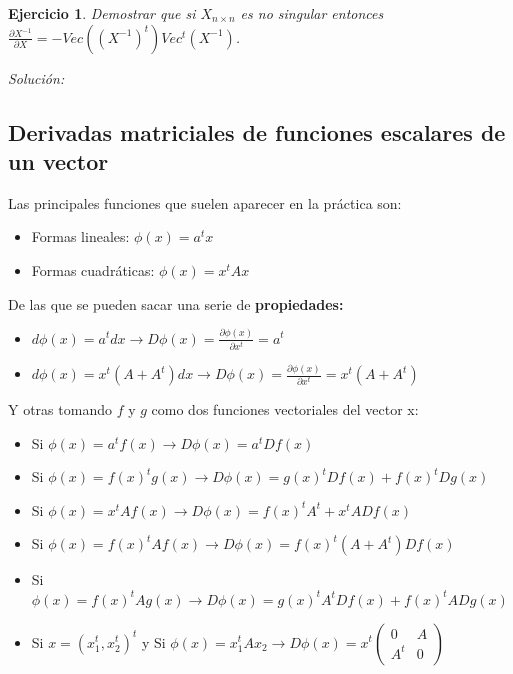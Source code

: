 \documentclass{article}
\theoremstyle{theorem-style}  %
\theoremstyle{definition-style}
\theoremstyle{example-style}
\theoremstyle{exercise-style}
\newtheorem{exercise}{Ejercicio}[section]
\begin{document}
\begin{exercise}
	Demostrar que si $X_{n\times n}$ es no singular entonces $\displaystyle \frac{\partial X^{-1}}{\partial X} = -Vec((X^{-1})^t)Vec^t(X^{-1})$.
\end{exercise}
\textit{Solución:}

\subsection{Derivadas matriciales de funciones escalares de un vector}

Las principales funciones que suelen aparecer en la práctica son:

\begin{itemize}
	\item Formas lineales: $\phi(x)=a^tx$
	\item Formas cuadráticas: $\phi(x)=x^tAx$
\end{itemize}

De las que se pueden sacar una serie de \textbf{propiedades:}

\begin{itemize}
	\item $d\phi(x) = a^tdx \rightarrow D\phi(x) = \frac{\partial \phi(x)}{\partial x^t} = a^t$
	\item $d\phi(x) = x^t(A+A^t)dx \rightarrow D\phi(x) = \frac{\partial \phi(x)}{\partial x^t} = x^t(A+A^t)$
	
\end{itemize}

Y otras tomando $f$ y $g$ como dos funciones vectoriales del vector x:

\begin{itemize}
	\item Si $\phi(x) = a^tf(x) \rightarrow D\phi(x) = a^tDf(x)$
	\item  Si $\phi(x) = f(x)^tg(x) \rightarrow D\phi(x) = g(x)^tDf(x)+ f(x)^tDg(x)$
	\item Si $\phi(x) = x^tAf(x) \rightarrow D\phi(x) = f(x)^t A^t + x^tADf(x)$
	\item Si $\phi(x) = f(x)^tAf(x) \rightarrow D\phi(x) = f(x)^t(A+A^t)Df(x)$
	\item Si $\phi(x) = f(x)^tAg(x) \rightarrow D\phi(x) = g(x)^tA^tDf(x)+ f(x)^tADg(x)$
	\item Si $x=(x_1^t,x_2^t)^t$ y Si $\phi(x) = x_1^tAx_2 \rightarrow D\phi(x) = x^t (\begin{array}{cc}
	0 & A\\
	A^t  & 0
	\end{array})$ 
\end{itemize}
	
\end{document}

